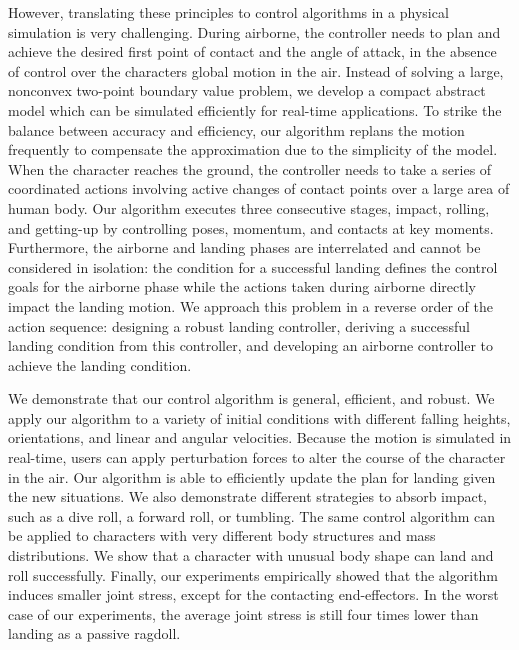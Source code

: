 However, translating these principles to control algorithms in
a physical simulation is very challenging. During airborne, the
controller needs to plan and achieve the desired first point of
contact and the angle of attack, in the absence of control over the
characters global motion in the air. Instead of solving a large,
nonconvex two-point boundary value problem, we develop a compact
abstract model which can be simulated efficiently for real-time
applications. To strike the balance between accuracy and efficiency,
our algorithm replans the motion frequently to compensate the
approximation due to the simplicity of the model. When the character
reaches the ground, the controller needs to take a series of
coordinated actions involving active changes of contact points over
a large area of human body. Our algorithm executes three consecutive
stages, impact, rolling, and getting-up by controlling poses,
momentum, and contacts at key moments. Furthermore, the airborne and
landing phases are interrelated and cannot be considered in
isolation: the condition for a successful landing defines the
control goals for the airborne phase while the actions taken during
airborne directly impact the landing motion. We approach this
problem in a reverse order of the action sequence: designing a
robust landing controller, deriving a successful landing condition
from this controller, and developing an airborne controller to achieve
the landing condition.


We demonstrate that our control algorithm is general,
efficient, and robust. We apply our algorithm to a variety of
initial conditions with different falling heights, orientations, and
linear and angular velocities. Because the motion is simulated in
real-time, users can apply perturbation forces to alter the course
of the character in the air. Our algorithm is able to efficiently
update the plan for landing given the new situations. We also
demonstrate different strategies to absorb impact, such as a dive
roll, a forward roll, or tumbling. The same control algorithm can be
applied to characters with very different body structures and mass
distributions. We show that a character with unusual body shape can
land and roll successfully.  
Finally, our experiments empirically showed that the algorithm induces
smaller joint stress, except for the contacting end-effectors. In
the worst case of our experiments, the average joint stress is still
four times lower than landing as a passive ragdoll.



